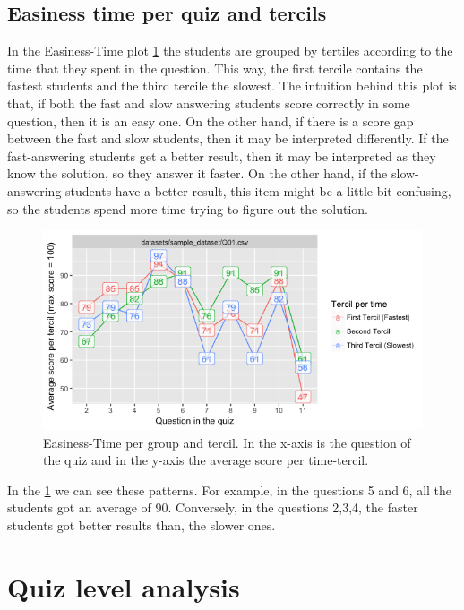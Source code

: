 \subsection{Easiness time per quiz and tercils}

In the Easiness-Time plot \cref{img:group_order} the students are grouped by tertiles according to the time that they spent in the question. This way, the first tercile contains the fastest students and the third tercile the slowest. The intuition behind this plot is that, if both the fast and slow answering students score correctly in some question, then it is an easy one. On the other hand, if there is a score gap between the fast and slow students, then it may be interpreted differently. If the fast-answering students get a better result, then it may be interpreted as they know the solution, so they answer it faster. On the other hand, if the slow-answering students have a better result, this item might be a little bit confusing, so the students spend more time trying to figure out the solution.

\begin{figure}[ht!]
  \centering
  \includegraphics[width=\linewidth]{img/group_order.png}
  \caption{Easiness-Time per group and tercil. In the x-axis is the question of the quiz and in the y-axis the average score per time-tercil.}
  \label{img:group_order}
\end{figure}

In the \cref{img:group_order} we can see these patterns. For example, in the questions 5 and 6, all the students got an average of 90. Conversely, in the questions 2,3,4, the faster students got better results than, the slower ones.

\section{Quiz level analysis}

